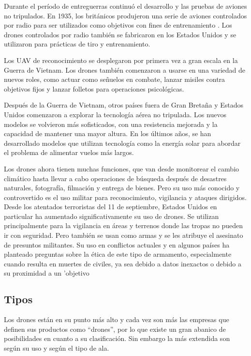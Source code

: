 Durante el período de entreguerras continuó el desarrollo y las pruebas de aviones no tripulados. En 1935, los británicos produjeron una serie de aviones controlados por radio para ser utilizados como objetivos con fines de entrenamiento . Los drones controlados por radio también se fabricaron en los Estados Unidos y se utilizaron para prácticas de tiro y entrenamiento.\newline

Los UAV de reconocimiento se desplegaron por primera vez a gran escala en la Guerra de Vietnam. Los drones también comenzaron a usarse en una variedad de nuevos roles, como actuar como señuelos en combate, lanzar misiles contra objetivos fijos y lanzar folletos para operaciones psicológicas. 

Después de la Guerra de Vietnam, otros países fuera de Gran Bretaña y Estados Unidos comenzaron a explorar la tecnología aérea no tripulada. Los nuevos modelos se volvieron más sofisticados, con una resistencia mejorada y la capacidad de mantener una mayor altura. En los últimos años, se han desarrollado modelos que utilizan tecnología como la energía solar para abordar el problema de alimentar vuelos más largos. \newline

Los drones ahora tienen muchas funciones, que van desde monitorear el cambio climático hasta llevar a cabo operaciones de búsqueda después de desastres naturales, fotografía, filmación y entrega de bienes. Pero su uso más conocido y controvertido es el uso militar para reconocimiento, vigilancia y ataques dirigidos. Desde los atentados terroristas del 11 de septiembre, Estados Unidos en particular ha aumentado significativamente su uso de drones. Se utilizan principalmente para la vigilancia en áreas y terrenos donde las tropas no pueden ir con seguridad. Pero también se usan como armas y se les atribuye el asesinato de presuntos militantes. Su uso en conflictos actuales y en algunos países ha planteado preguntas sobre la ética de este tipo de armamento, especialmente cuando resulta en muertes de civiles, ya sea debido a datos inexactos o debido a su proximidad a un 'objetivo\newline


\subsection{Tipos}

Los drones están en su punto más alto y cada vez son más las empresas que definen sus productos como “drones”, por lo que existe un gran abanico de posibilidades en cuanto a su clasificación. Sin embargo la más extendida son según su uso y según el tipo de ala. \newline


